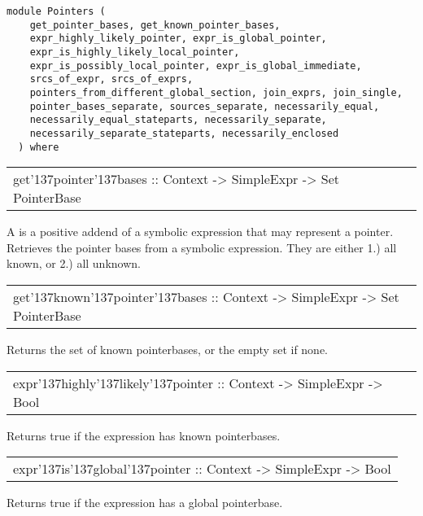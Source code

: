\label{module:Pointers}
\haddockbeginheader
{\haddockverb\begin{verbatim}
module Pointers (
    get_pointer_bases, get_known_pointer_bases,
    expr_highly_likely_pointer, expr_is_global_pointer,
    expr_is_highly_likely_local_pointer,
    expr_is_possibly_local_pointer, expr_is_global_immediate,
    srcs_of_expr, srcs_of_exprs,
    pointers_from_different_global_section, join_exprs, join_single,
    pointer_bases_separate, sources_separate, necessarily_equal,
    necessarily_equal_stateparts, necessarily_separate,
    necessarily_separate_stateparts, necessarily_enclosed
  ) where\end{verbatim}}
\haddockendheader

\begin{haddockdesc}
\item[\begin{tabular}{@{}l}
get{\char '137}pointer{\char '137}bases :: Context -> SimpleExpr -> Set PointerBase
\end{tabular}]
{\haddockbegindoc
A  is a positive addend of a symbolic expression that may represent a pointer.
 Retrieves the pointer bases from a symbolic expression.
 They are either 1.) all known, or 2.) all unknown.\par}
\end{haddockdesc}
\begin{haddockdesc}
\item[\begin{tabular}{@{}l}
get{\char '137}known{\char '137}pointer{\char '137}bases :: Context -> SimpleExpr -> Set PointerBase
\end{tabular}]
{\haddockbegindoc
Returns the set of known pointerbases, or the empty set if none.\par}
\end{haddockdesc}
\begin{haddockdesc}
\item[\begin{tabular}{@{}l}
expr{\char '137}highly{\char '137}likely{\char '137}pointer :: Context -> SimpleExpr -> Bool
\end{tabular}]
{\haddockbegindoc
Returns true if the expression has known pointerbases.\par}
\end{haddockdesc}
\begin{haddockdesc}
\item[\begin{tabular}{@{}l}
expr{\char '137}is{\char '137}global{\char '137}pointer :: Context -> SimpleExpr -> Bool
\end{tabular}]
{\haddockbegindoc
Returns true if the expression has a global pointerbase.\par}
\end{haddockdesc}
